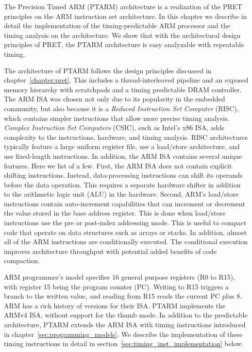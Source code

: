 The Precision Timed ARM (PTARM) architecture is a realization of the PRET principles on the ARM instruction set architecture. 
In this chapter we describe in detail the implementation of the timing-predictable ARM processor and the timing analysis on the architecture.
We show that with the architectural design principles of PRET, the PTARM architecture is easy analyzable with repeatable timing.
  
The architecture of PTARM follows the design principles discussed in chapter~\ref{chapter:pret}.
This includes a thread-interleaved pipeline and an exposed memory hierarchy with scratchpads and a timing predictable DRAM controller.
The ARM ISA was chosen not only due to its popularity in the embedded community, but also because it is a \emph{Reduced Instruction Set Computer} (RISC), which contains simpler instructions that allow more precise timing analysis. 
\emph{Complex Instruction Set Computers} (CSIC), such as Intel's x86 ISA, adds complexity to the instructions, hardware, and timing analysis.
RISC architectures typically feature a large uniform register file, use a load/store architecture, and use fixed-length instructions.
In addition, the ARM ISA contains several unique features. 
Here we list of a few.  
First, the ARM ISA does not contain explicit shifting instructions.
Instead, data-processing instructions can shift its operands before the data operation. 
This requires a separate hardware shifter in addition to the arithmetic logic unit (ALU) in the hardware.  
Second, ARM's load/store instructions contain auto-increment capabilities that can increment or decrement the value stored in the base address register.
This is done when load/store instructions use the pre or post-index addressing mode.   
This is useful to compact code that operate on data structures such as arrays or stacks. 
In addition, almost all of the ARM instructions are conditionally executed.
The conditional execution improves architecture throughput with potential added benefits of code compaction.     

ARM programmer's model specifies 16 general purpose registers (R0 to R15), with register 15 being the program counter (PC). 
Writing to R15 triggers a branch to the written value, and reading from R15 reads the current PC plus 8.
ARM has a rich history of versions for their ISA.
PTARM implements the ARMv4 ISA, without support for the thumb mode.
In addition to the predictable architecture, PTARM extends the ARM ISA with timing instructions introduced in chapter~\ref{sec:programming_models}.
We describe the implementation of these timing instructions in detail in section~\ref{sec:timing_inst_implementation} below.    


